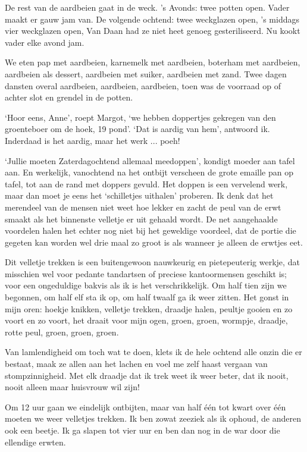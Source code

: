 \documentclass{book}
\begin{document}
De rest van de aardbeien gaat in de weck. 's Avonds: twee potten open.
Vader maakt er gauw jam van. De volgende ochtend: twee weckglazen open,
's middags vier weckglazen open, Van Daan had ze niet heet genoeg
gesteriliseerd. Nu kookt vader elke avond jam.

We eten pap met aardbeien, karnemelk met aardbeien, boterham met
aardbeien, aardbeien als dessert, aardbeien met suiker, aardbeien met
zand. Twee dagen dansten overal aardbeien, aardbeien, aardbeien, toen
was de voorraad op of achter slot en grendel in de potten.

`Hoor eens, Anne', roept Margot, `we hebben doppertjes gekregen van den
groenteboer om de hoek, 19 pond'. `Dat is aardig van hem', antwoord ik.
Inderdaad is het aardig, maar het werk ... poeh!

`Jullie moeten Zaterdagochtend allemaal meedoppen', kondigt moeder aan
tafel aan. En werkelijk, vanochtend na het ontbijt verscheen de grote
emaille pan op tafel, tot aan de rand met doppers gevuld. Het doppen is
een vervelend werk, maar dan moet je eens het `schilletjes uithalen'
proberen. Ik denk dat het merendeel van de mensen niet weet hoe lekker
en zacht de peul van de erwt smaakt als het binnenste velletje er uit
gehaald wordt. De net aangehaalde voordelen halen het echter nog niet
bij het geweldige voordeel, dat de portie die gegeten kan worden wel
drie maal zo groot is als wanneer je alleen de erwtjes eet.

Dit velletje trekken is een buitengewoon nauwkeurig en pietepeuterig
werkje, dat misschien wel voor pedante tandartsen of preciese
kantoormensen geschikt is; voor een ongeduldige bakvis als ik is het
verschrikkelijk. Om half tien zijn we begonnen, om half elf sta ik op,
om half twaalf ga ik weer zitten. Het gonst in mijn oren: hoekje
knikken, velletje trekken, draadje halen, peultje gooien en zo voort en
zo voort, het draait voor mijn ogen, groen, groen, wormpje, draadje,
rotte peul, groen, groen, groen.

Van lamlendigheid om toch wat te doen, klets ik de hele ochtend alle
onzin die er bestaat, maak ze allen aan het lachen en voel me zelf haast
vergaan van stompzinnigheid. Met elk draadje dat ik trek weet ik weer
beter, dat ik nooit, nooit alleen maar huisvrouw wil zijn!

Om 12 uur gaan we eindelijk ontbijten, maar van half één tot kwart over
één moeten we weer velletjes trekken. Ik ben zowat zeeziek als ik
ophoud, de anderen ook een beetje. Ik ga slapen tot vier uur en ben dan
nog in de war door die ellendige erwten.
\end{document}
